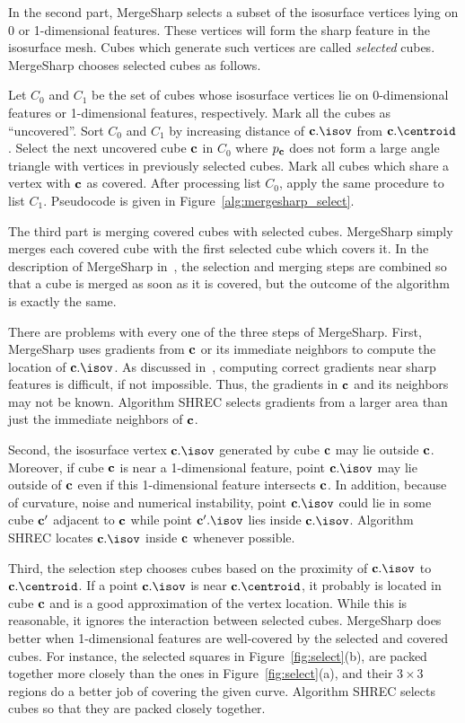 In the second part, MergeSharp selects a subset of the isosurface vertices
lying on 0 or 1-dimensional features.
These vertices will form the sharp feature in the isosurface mesh.
Cubes which generate such vertices are called {\em selected} cubes.
MergeSharp chooses selected cubes as follows.

Let $C_0$ and $C_1$ be the set of cubes whose isosurface vertices
lie on 0-dimensional features or 1-dimensional features, respectively.
Mark all the cubes as ``uncovered''.
Sort $C_0$ and $C_1$ by increasing distance
of $\cb.\isov$ from $\cb.\centroid$.
Select the next uncovered cube $\mathbf{c}$ in $C_0$
where $p_{\mathbf{c}}$ does not form a large angle triangle 
with vertices in previously selected cubes.
Mark all cubes which share a vertex with $\mathbf{c}$ as covered.
After processing list $C_0$, apply the same procedure to list $C_1$.
Pseudocode is given in Figure~\ref{alg:mergesharp_select}.

The third part is merging covered cubes with selected cubes.
MergeSharp simply merges each covered cube with the first selected cube
which covers it.
In the description of MergeSharp in~\cite{bw-cisec-13}, 
the selection and merging steps are combined
so that a cube is merged as soon as it is covered,
but the outcome of the algorithm is exactly the same.

There are problems with every one of the three steps of MergeSharp.
First, MergeSharp uses gradients from $\mathbf{c}$ or its immediate neighbors
to compute the location of $\cb.\isov$.
As discussed in~\cite{bw-isifsd-15},
computing correct gradients near sharp features is difficult,
if not impossible.
Thus, the gradients in $\mathbf{c}$ and its neighbors may not be known.
Algorithm SHREC selects gradients from a larger area
than just the immediate neighbors of $\mathbf{c}$.

Second, the isosurface vertex $\cb.\isov$ generated by cube $\mathbf{c}$
may lie outside $\mathbf{c}$.
Moreover, if cube $\mathbf{c}$ is near a 1-dimensional feature,
point $\cb.\isov$ may lie outside of $\mathbf{c}$
even if this 1-dimensional feature intersects $\mathbf{c}$.
In addition, because of curvature, noise and numerical instability,
point $\cb.\isov$ could lie in some cube $\mathbf{c}'$ adjacent to $\mathbf{c}$
while point $\cb'.\isov$ lies inside $\cb.\isov$.
Algorithm SHREC locates $\cb.\isov$ inside $\mathbf{c}$ whenever possible.

Third, the selection step chooses cubes based on the proximity
of $\cb.\isov$ to $\cb.\centroid$.
If a point $\cb.\isov$ is near $\cb.\centroid$,
it probably is located in cube $\mathbf{c}$ 
and is a good approximation of the vertex location.
While this is reasonable,
it ignores the interaction between selected cubes.
MergeSharp does better when 1-dimensional features are well-covered 
by the selected and covered cubes.
For instance, 
the selected squares in Figure~\ref{fig:select}(b), 
are packed together more closely
than the ones in Figure~\ref{fig:select}(a), 
and their $3 \times 3$ regions do a better job of covering
the given curve.
Algorithm SHREC selects cubes so that they are packed closely together.

